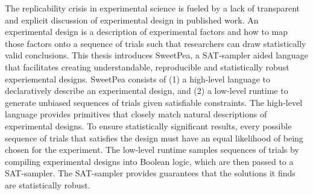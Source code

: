 
The replicability crisis in experimental science is fueled by a lack of transparent and explicit discussion of experimental design in published work. An experimental design is a description of experimental factors and how to map those factors onto a sequence of trials such that researchers can draw statistically valid conclusions. This thesis introduces SweetPea, a SAT-sampler aided language that facilitates creating understandable, reproducible and statistically robust experiemental designs. SweetPea consists of (1) a high-level language to declaratively describe an experimental design, and (2) a low-level runtime to generate unbiased sequences of trials given satisfiable constraints. The high-level language provides primitives that closely match natural descriptions of experimental designs. To ensure statistically significant results, every possible sequence of trials that satisfies the design must have an equal likelihood of being chosen for the experiment. The low-level runtime samples sequences of trials by compiling experimental designs into Boolean logic, which are then passed to a SAT-sampler. The SAT-sampler provides guarantees that the solutions it finds are statistically robust.
